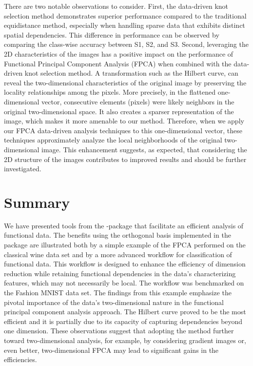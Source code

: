 There are two notable observations to consider. First, the data-driven knot selection method demonstrates superior performance compared to the traditional equidistance method, especially when handling sparse data that exhibits distinct spatial dependencies. This difference in performance can be observed by comparing the class-wise accuracy between S1, S2, and S3. Second, leveraging the 2D characteristics of the images has a positive impact on the performance of Functional Principal Component Analysis (FPCA) when combined with the data-driven knot selection method. A transformation such as the Hilbert curve, can reveal the two-dimensional characteristics of the original image by preserving the locality relationships among the pixels. More precisely, in the flattened one-dimensional vector, consecutive elements (pixels) were likely neighbors in the original two-dimensional space. It also creates a sparser representation of the image, which makes it more amenable to our method. Therefore, when we apply our FPCA data-driven analysis techniques to this one-dimensional vector, these techniques approximately analyze the local neighborhoods of the original two-dimensional image. This enhancement suggests, as expected, that considering the 2D structure of the images contributes to improved results and should be further investigated.

\vspace{-.13cm}
\section{Summary}
\vspace{-.22cm}
We have presented tools from the -package that facilitate an efficient analysis of functional data. The benefits using the orthogonal basis implemented in the package are illustrated both by a simple example of the FPCA performed on the classical wine data set and by a more advanced workflow for classification of functional data. 
This workflow is designed to enhance the efficiency of dimension reduction while retaining functional dependencies in the data's characterizing features, which may not necessarily be local. 
The workflow was benchmarked on the Fashion MNIST data set. 
The findings from this example emphasize the pivotal importance of the data's two-dimensional nature in the functional principal component analysis approach. 
The Hilbert curve proved to be the most efficient and it is partially due to its capacity of capturing dependencies beyond one dimension. 
These observations suggest that adopting the method further toward two-dimensional analysis, for example, by considering gradient images or, even better, two-dimensional FPCA may lead to significant gains in the efficiencies.



\vspace{-.1cm}
